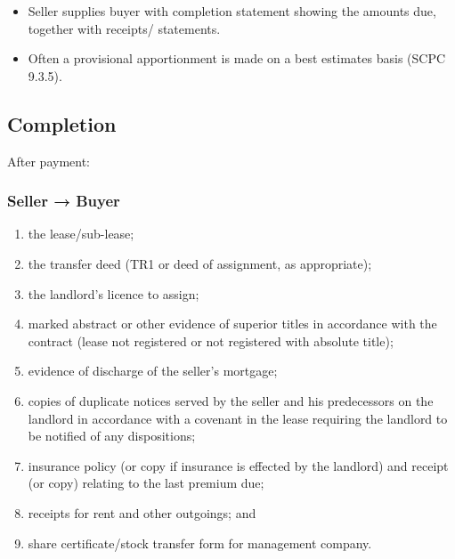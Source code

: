 \documentclass[
]{article}
\providecommand{\tightlist}{%
  \setlength{\itemsep}{0pt}\setlength{\parskip}{0pt}}
\begin{document}
\begin{itemize}
  \begin{itemize}
  \tightlist
  \item
    Seller supplies buyer with completion statement showing the amounts
    due, together with receipts/ statements.
  \item
    Often a provisional apportionment is made on a best estimates basis
    (SCPC 9.3.5).
  \end{itemize}
\end{itemize}

\hypertarget{completion-1}{%
\subsection{Completion}\label{completion-1}}

After payment:

\hypertarget{seller-buyer}{%
\subsubsection{Seller → Buyer}\label{seller-buyer}}

\begin{enumerate}
\def\labelenumi{\arabic{enumi}.}
\tightlist
\item
  the lease/sub-lease;\\
\item
  the transfer deed (TR1 or deed of assignment, as appropriate);\\
\item
  the landlord's licence to assign;\\
\item
  marked abstract or other evidence of superior titles in accordance
  with the contract (lease not registered or not registered with
  absolute title);\\
\item
  evidence of discharge of the seller's mortgage;\\
\item
  copies of duplicate notices served by the seller and his predecessors
  on the landlord in accordance with a covenant in the lease requiring
  the landlord to be notified of any dispositions;\\
\item
  insurance policy (or copy if insurance is effected by the landlord)
  and receipt (or copy) relating to the last premium due;\\
\item
  receipts for rent and other outgoings; and\\
\item
  share certificate/stock transfer form for management company.
\end{enumerate}
\end{document}
